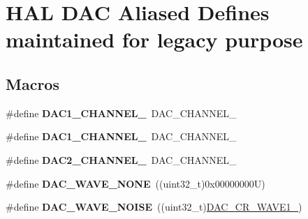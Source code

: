 \hypertarget{group___h_a_l___d_a_c___aliased___defines}{}\section{H\+AL D\+AC Aliased Defines maintained for legacy purpose}
\label{group___h_a_l___d_a_c___aliased___defines}
\subsection*{Macros}
\begin{DoxyCompactItemize}
\item 
\mbox{\label{group___h_a_l___d_a_c___aliased___defines_gacd0eabd250f1026912b0e3f7deecb2e7}} 
\#define {\bfseries D\+A\+C1\+\_\+\+C\+H\+A\+N\+N\+E\+L\+\_}~D\+A\+C\+\_\+\+C\+H\+A\+N\+N\+E\+L\+\_
\item 
\mbox{\label{group___h_a_l___d_a_c___aliased___defines_ga6358f0c4cfc9a0e67a739bf6cf17870c}} 
\#define {\bfseries D\+A\+C1\+\_\+\+C\+H\+A\+N\+N\+E\+L\+\_}~D\+A\+C\+\_\+\+C\+H\+A\+N\+N\+E\+L\+\_
\item 
\mbox{\label{group___h_a_l___d_a_c___aliased___defines_ga8d40044bd0865cdb12fea604852f2582}} 
\#define {\bfseries D\+A\+C2\+\_\+\+C\+H\+A\+N\+N\+E\+L\+\_}~D\+A\+C\+\_\+\+C\+H\+A\+N\+N\+E\+L\+\_
\item 
\mbox{\label{group___h_a_l___d_a_c___aliased___defines_ga7e80010819867e162e936510093a4cef}} 
\#define {\bfseries D\+A\+C\+\_\+\+W\+A\+V\+E\+\_\+\+N\+O\+NE}~((uint32\+\_\+t)0x00000000\+U)
\item 
\mbox{\label{group___h_a_l___d_a_c___aliased___defines_ga4585a41ff6dfd14971119283f1d8045b}} 
\#define {\bfseries D\+A\+C\+\_\+\+W\+A\+V\+E\+\_\+\+N\+O\+I\+SE}~((uint32\+\_\+t)\hyperlink{group___peripheral___registers___bits___definition_ga0871e6466e3a7378103c431832ae525a}{D\+A\+C\+\_\+\+C\+R\+\_\+\+W\+A\+V\+E1\+\_})
\item 
\mbox{\label{group___h_a_l___d_a_c___aliased___defines_ga8340be3743135476cb33a7daf7e6ace5}} 

\end{DoxyCompactItemize}
